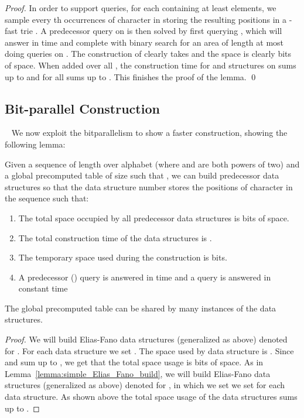 \documentclass[11pt,runningheads]{llncs}
\begin{document}
{\begin{proof}
In order to support  queries, for each  containing at least  elements, we sample every th occurrences of character  in  storing the resulting positions in a -fast trie . A predecessor query on  is then solved by first querying , which will answer in time  and complete with binary search for an area of length at most  doing   queries on . The construction of  clearly takes  and the space is clearly  bits of space. When added over all , the construction time for  and  structures on  sums up to  and for all  sums up to . This finishes the proof of the lemma.  
\qed
\end{proof}

\subsection{Bit-parallel Construction}
~\label{sec:bit_parallel_Elias_Fano_construction}
We now exploit the bitparallelism to show a faster construction, showing the following lemma: 
\begin{lemma}
\label{lemma:bit_parallel_elias_fano_build}
Given a sequence  of length  over alphabet  
(where  and  are both powers of two) and a global precomputed table of size  
such that , we can build  predecessor data structures 
so that the data structure number  stores the positions of character   in the sequence  such that: 
\begin{enumerate} 
\item The total space occupied by all predecessor data structures is  bits of space. 
\item The total construction time of the data structures is . 
\item The temporary space used during the construction is  bits. 
\item A predecessor () query is answered in time  and 
a  query is answered in constant time
\end{enumerate}
The global precomputed table can be shared by many instances of the data structures. 
\end{lemma}
\begin{proof}
We will build  Elias-Fano data structures (generalized as above)
denoted  for . 
For each data structure we set . The space used by data structure 
 is . 
Since  and  sum up to , we get that the total space usage is 
bits of space. 
As in Lemma~\ref{lemma:simple_Elias_Fano_build}, we will build  Elias-Fano data structures (generalized as above)
denoted  for , in which we set we set  for each data structure. 
As shown above the total space usage of the data structures sums up to . 


\end{proof}}
\end{document}

